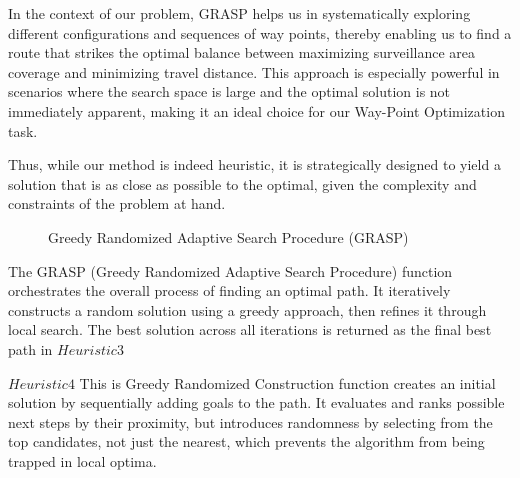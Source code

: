In the context of our problem, GRASP helps us in systematically exploring different configurations and sequences of way points, thereby enabling us to find a route that strikes the optimal balance between maximizing surveillance area coverage and minimizing travel distance. This approach is especially powerful in scenarios where the search space is large and the optimal solution is not immediately apparent, making it an ideal choice for our Way-Point Optimization task.

Thus, while our method is indeed heuristic, it is strategically designed to yield a solution that is as close as possible to the optimal, given the complexity and constraints of the problem at hand.




\begin{figure}[H]
\begin{algorithm}[H]
\DontPrintSemicolon
{}
\caption{Greedy Randomized Adaptive Search Procedure (GRASP)}
\end{algorithm}
\end{figure}

The GRASP (Greedy Randomized Adaptive Search Procedure) function orchestrates the overall process of finding an optimal path. It iteratively constructs a random solution using a greedy approach, then refines it through local search. The best solution across all iterations is returned as the final best path in \(Heuristic 3\)

\(Heuristic 4\) This is Greedy Randomized Construction function creates an initial solution by sequentially adding goals to the path. It evaluates and ranks possible next steps by their proximity, but introduces randomness by selecting from the top candidates, not just the nearest, which prevents the algorithm from being trapped in local optima.


